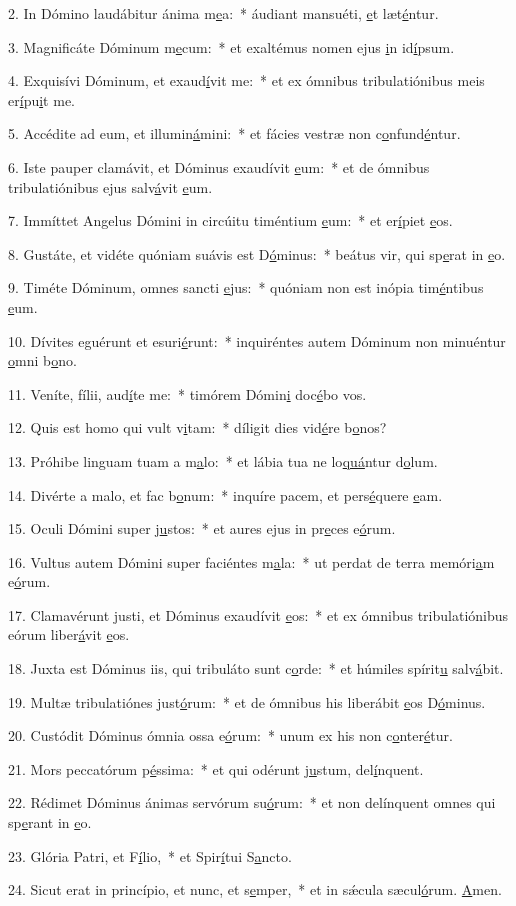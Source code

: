 2. In Dómino laudábitur ánima m\uline{e}a:~* áudiant mansuéti, \uline{e}t læt\uline{é}ntur.\par 
3. Magnificáte Dóminum m\uline{e}cum:~* et exaltémus nomen ejus \uline{i}n id\uline{í}psum.\par 
4. Exquisívi Dóminum, et exaud\uline{í}vit me:~* et ex ómnibus tribulatiónibus meis er\uline{í}pu\uline{i}t me.\par 
5. Accédite ad eum, et illumin\uline{á}mini:~* et fácies vestræ non c\uline{o}nfund\uline{é}ntur.\par 
6. Iste pauper clamávit, et Dóminus exaudívit \uline{e}um:~* et de ómnibus tribulatiónibus ejus salv\uline{á}vit \uline{e}um.\par 
7. Immíttet Angelus Dómini in circúitu timéntium \uline{e}um:~* et er\uline{í}piet \uline{e}os.\par 
8. Gustáte, et vidéte quóniam suávis est D\uline{ó}minus:~* beátus vir, qui sp\uline{e}rat in \uline{e}o.\par 
9. Timéte Dóminum, omnes sancti \uline{e}jus:~* quóniam non est inópia tim\uline{é}ntibus \uline{e}um.\par 
10. Dívites eguérunt et esuri\uline{é}runt:~* inquiréntes autem Dóminum non minuéntur \uline{o}mni b\uline{o}no.\par 
11. Veníte, fílii, aud\uline{í}te me:~* timórem Dómin\uline{i} doc\uline{é}bo vos.\par 
12. Quis est homo qui vult v\uline{i}tam:~* díligit dies vid\uline{é}re b\uline{o}nos?\par 
13. Próhibe linguam tuam a m\uline{a}lo:~* et lábia tua ne lo\uline{quá}ntur d\uline{o}lum.\par 
14. Divérte a malo, et fac b\uline{o}num:~* inquíre pacem, et pers\uline{é}quere \uline{e}am.\par 
15. Oculi Dómini super j\uline{u}stos:~* et aures ejus in pr\uline{e}ces e\uline{ó}rum.\par 
16. Vultus autem Dómini super faciéntes m\uline{a}la:~* ut perdat de terra memóri\uline{a}m e\uline{ó}rum.\par 
17. Clamavérunt justi, et Dóminus exaudívit \uline{e}os:~* et ex ómnibus tribulatiónibus eórum liber\uline{á}vit \uline{e}os.\par 
18. Juxta est Dóminus iis, qui tribuláto sunt c\uline{o}rde:~* et húmiles spírit\uline{u} salv\uline{á}bit.\par 
19. Multæ tribulatiónes just\uline{ó}rum:~* et de ómnibus his liberábit \uline{e}os D\uline{ó}minus.\par 
20. Custódit Dóminus ómnia ossa e\uline{ó}rum:~* unum ex his non c\uline{o}nter\uline{é}tur.\par 
21. Mors peccatórum p\uline{é}ssima:~* et qui odérunt j\uline{u}stum, del\uline{í}nquent.\par 
22. Rédimet Dóminus ánimas servórum su\uline{ó}rum:~* et non delínquent omnes qui sp\uline{e}rant in \uline{e}o.\par 
23. Glória Patri, et F\uline{í}lio,~* et Spir\uline{í}tui S\uline{a}ncto.\par 
24. Sicut erat in princípio, et nunc, et s\uline{e}mper,~* et in sǽcula sæcul\uline{ó}rum. \uline{A}men.\par 
